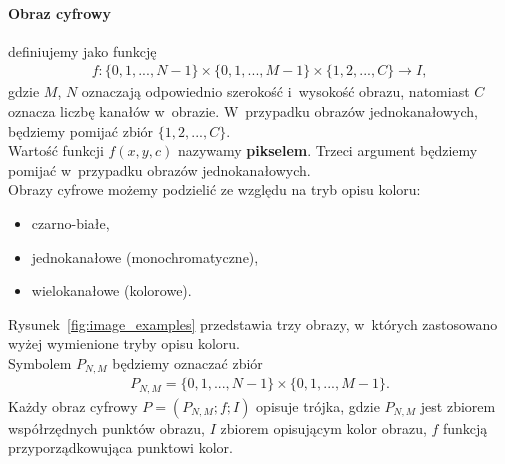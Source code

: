 \paragraph{Obraz cyfrowy} definiujemy jako funkcję
\begin{gather*}
  f: \{0, 1, ..., N-1\} \times \{0, 1, ..., M-1\} \times \{1, 2, ..., C\} \rightarrow I,
\end{gather*}
gdzie $M$, $N$ oznaczają odpowiednio szerokość i~wysokość obrazu, natomiast $C$ oznacza liczbę kanałów w~obrazie. W~przypadku obrazów jednokanałowych, będziemy pomijać zbiór $\{1, 2, ..., C\}$.\\
Wartość funkcji $f(x, y, c)$ nazywamy \textbf{pikselem}. Trzeci argument będziemy pomijać w~przypadku obrazów jednokanałowych. \\
Obrazy cyfrowe możemy podzielić ze względu na tryb opisu koloru:
\begin{itemize}
  \item czarno-białe,
  \item jednokanałowe (monochromatyczne),
  \item wielokanałowe (kolorowe).
\end{itemize}
Rysunek~\ref{fig:image_examples} przedstawia trzy obrazy, w~których zastosowano wyżej wymienione tryby opisu koloru.\\
Symbolem $P_{N,M}$ będziemy oznaczać zbiór
\begin{gather*}
  P_{N,M} = \{0, 1, ..., N-1\} \times \{0, 1, ..., M-1\}.
\end{gather*}
Każdy obraz cyfrowy $P = (P_{N,M}; f; I)$ opisuje trójka, gdzie $P_{N,M}$ jest zbiorem współrzędnych punktów obrazu, $I$ zbiorem opisującym kolor obrazu, $f$ funkcją przyporządkowująca punktowi kolor.

